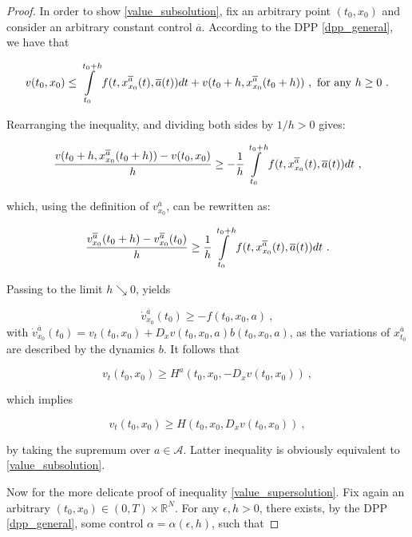 \begin{theorem}
\begin{proof}
		In order to show \ref{value_subsolution}, fix an arbitrary point $ (t_0, x_0) $ and consider an arbitrary constant control $ \overline{a} $.
		According to the DPP \ref{dpp_general}, we have that
		
		\begin{equation*}
			v(t_0, x_0) \leq \pathint{\overline{a}}{t_0}{t_0 + h} + v(t_0 + h,  x^{\overline{a}}_{x_0}(t_0 + h)) \ , \hbox{ for any } h \geq 0 \ .
		\end{equation*}
		
		Rearranging the inequality, and dividing both sides by $ 1 / h > 0 $ gives:
		
		\begin{equation}
			\label{diff_quotient_sub}
			\frac{v(t_0 + h, x^{\overline{a}}_{x_0}(t_0 + h)) - v(t_0, x_0)}{h} \geq - \frac{1}{h} \pathint{\overline{a}}{t_0}{t_0 + h} \ ,
		\end{equation}
		
		which, using the definition of $ v^{\overline{a}}_{x_0} $, can be rewritten as:
		
		\begin{equation*}
			\frac{v^{\overline{a}}_{x_0}(t_0 + h) - v^{\overline{a}}_{x_0}(t_0)}{h} \geq \frac{1}{h} \pathint{\overline{a}}{t_0}{t_0 + h} \ .
		\end{equation*}
		
		Passing to the limit $ h \searrow 0 $, yields
		
		\begin{equation*}
			\dot{v}^{\overline{a}}_{x_0}(t_0) \geq - f(t_0, x_0, a) \ ,
		\end{equation*}
		with $ \dot{v}^{\overline{a}}_{x_0}(t_0) = v_t(t_0, x_0) +  D_x v(t_0, x_0, a) b(t_0, x_0, a) $, as the variations of $ x^{\overline{a}}_{t_0} $ are described by the dynamics $ b $. It follows that
		
		\begin{equation*}
			v_t(t_0, x_0) \geq H^{a}(t_0, x_0, - D_x v(t_0, x_0)) \ ,
		\end{equation*}
		
		which implies
		
		\begin{equation*}
			v_t(t_0, x_0) \geq H(t_0, x_0, D_x v(t_0, x_0)) \ ,
		\end{equation*}
		
		by taking the supremum over $ a \in \mathcal{A} $. Latter inequality is obviously equivalent to \ref{value_subsolution}.
		
		Now for the more delicate proof of inequality \ref{value_supersolution}. Fix again an arbitrary $ (t_0, x_0) \in \left( 0 , T \right) \times \mathbb{R}^N $. For any $ \epsilon, h > 0 $, there exists, by the DPP \ref{dpp_general}, some control $ \alpha = \alpha(\epsilon, h) $, such that
		

\end{proof}
\end{theorem}
